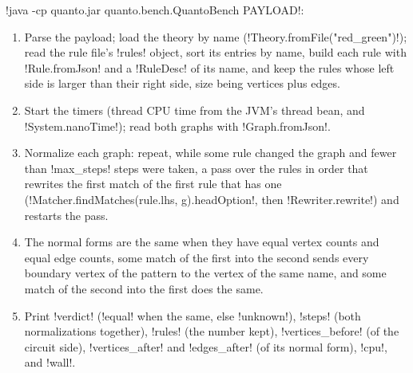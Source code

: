 {\begin{algorithm}\label{alg:bench-tools-quanto}
\code!java -cp quanto.jar quanto.bench.QuantoBench PAYLOAD!:
\begin{enumerate}
\item Parse the payload; load the theory by name (\code!Theory.fromFile("red_green")!); read the rule file's \code!rules! object, sort its entries by name, build each rule with \code!Rule.fromJson! and a \code!RuleDesc! of its name, and keep the rules whose left side is larger than their right side, size being vertices plus edges.
\item Start the timers (thread CPU time from the JVM's thread bean, and \code!System.nanoTime!); read both graphs with \code!Graph.fromJson!.
\item Normalize each graph: repeat, while some rule changed the graph and fewer than \code!max_steps! steps were taken, a pass over the rules in order that rewrites the first match of the first rule that has one (\code!Matcher.findMatches(rule.lhs, g).headOption!, then \code!Rewriter.rewrite!) and restarts the pass.
\item The normal forms are the same when they have equal vertex counts and equal edge counts, some match of the first into the second sends every boundary vertex of the pattern to the vertex of the same name, and some match of the second into the first does the same.
\item Print \code!verdict! (\code!equal! when the same, else \code!unknown!), \code!steps! (both normalizations together), \code!rules! (the number kept), \code!vertices_before! (of the circuit side), \code!vertices_after! and \code!edges_after! (of its normal form), \code!cpu!, and \code!wall!.
\end{enumerate}
\end{algorithm}

}
